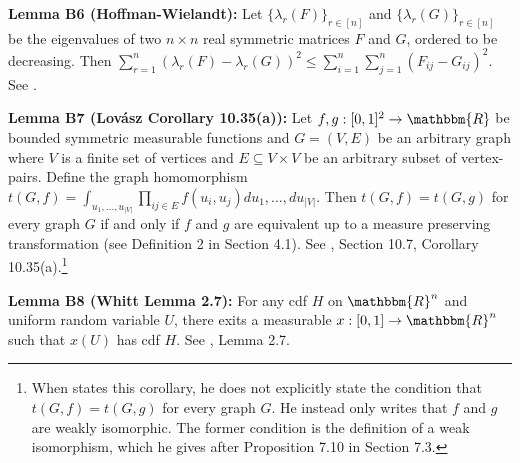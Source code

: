 \documentclass[12pt]{article}
\theoremstyle{definition}
\begin{document}
\begin{flushleft}
\textbf{Lemma B6 (Hoffman-Wielandt):} Let $\{\lambda_{r}(F)\}_{r \in [n]}$ and $\{\lambda_{r}(G)\}_{r \in [n]}$ be the eigenvalues of two $n\times n$ real symmetric matrices $F$ and $G$, ordered to be decreasing. Then $\sum_{r=1}^{n}\left( \lambda_{r}(F) - \lambda_{r}(G)\right)^{2} \leq \sum_{i=1}^{n}\sum_{j=1}^{n}\left(F_{ij}-G_{ij}\right)^{2}$. See \cite{hoffman1953hw}.    
\end{flushleft}

\begin{flushleft}
\textbf{Lemma B7 (Lov\'asz Corollary 10.35(a)):} Let $f,g: [0,1]^2 \to \mathbbm{R}$ be bounded symmetric measurable functions and $G = (V,E)$ be an arbitrary graph where $V$ is a finite set of vertices and $E \subseteq V \times V$ be an arbitrary subset of vertex-pairs. Define the graph homomorphism $t(G,f) = \int_{u_1,\ldots,u_{|V|}}\prod_{ij \in E}f(u_i,u_j)du_1,\ldots,du_{|V|}$. Then $t(G,f) = t(G,g)$ for every graph $G$ if and only if $f$ and $g$ are equivalent up to a measure preserving transformation (see Definition 2 in Section 4.1). See \cite{lovasz2012large}, Section 10.7, Corollary 10.35(a).\footnote{When \cite{lovasz2012large} states this corollary, he does not explicitly state the condition that $t(G,f) = t(G,g)$ for every graph $G$. He instead only writes that $f$ and $g$ are weakly isomorphic. The former condition is the definition of a weak isomorphism, which he gives after Proposition 7.10 in Section 7.3.}   
\end{flushleft}

\begin{flushleft}
\textbf{Lemma B8 (Whitt Lemma 2.7):} For any cdf $H$ on $\mathbbm{R}^{n}$ and uniform random variable $U$, there exits a measurable $x: [0,1]\to\mathbbm{R}^{n}$ such that $x(U)$ has cdf $H$. See \cite{whitt1976bivariate}, Lemma 2.7.
\end{flushleft}
\end{document}
